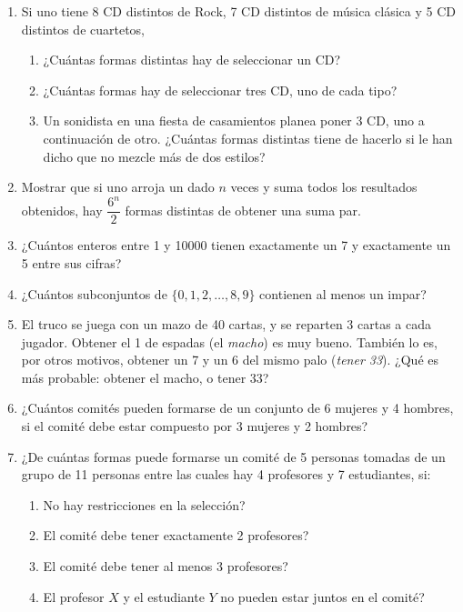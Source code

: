 \documentclass[a4paper,12pt,twoside,spanish,reqno]{amsbook}
\numberwithin{equation}{section}
\begin{document}
\begin {enumerate}
\item Si uno tiene 8 CD distintos de Rock, 7 CD distintos de música clásica y 5 CD distintos de cuartetos,
    \begin{enumerate}
        \item ¿Cuántas formas distintas hay de seleccionar un CD?
        \item ¿Cuántas formas hay de seleccionar tres CD, uno de cada tipo?
        \item Un sonidista en una fiesta de casamientos planea poner 3 CD, uno a continuación de otro. ¿Cuántas formas distintas tiene de hacerlo si le han dicho que no mezcle más de dos estilos?
    \end{enumerate}


\item Mostrar que si uno arroja un dado $n$ veces y suma todos los resultados obtenidos, hay $\dfrac{6^n}{2}$ formas distintas de obtener una suma par.


\item ¿Cuántos enteros entre 1 y 10000 tienen exactamente un 7 y exactamente un 5 entre sus cifras?


\item ¿Cuántos subconjuntos de $\{0,1,2,\dots,8,9\}$ contienen al menos un impar?


\item El truco se juega con un mazo de 40 cartas, y se reparten 3 cartas a cada jugador. Obtener el 1 de espadas (el {\it macho}) es muy bueno. También lo es, por otros motivos, obtener un 7 y un 6 del mismo palo ({\it tener 33}). ¿Qué es más probable: obtener el macho, o tener 33?


\item ¿Cuántos comités pueden formarse de un conjunto de 6 mujeres y 4 hombres, si el comité debe estar compuesto por 3 mujeres y 2 hombres?


\item ¿De cuántas formas puede formarse un comité de 5 personas tomadas de un grupo de 11 personas entre las cuales hay 4 profesores y 7 estudiantes, si:
    \begin{enumerate}
        \item No hay restricciones en la selección?
        \item El comité debe tener exactamente 2 profesores?
        \item El comité debe tener al menos 3 profesores?
        \item El profesor $X$ y el estudiante $Y$ no pueden estar juntos en el comité?
    \end{enumerate}



\end{enumerate}
\end{document}
